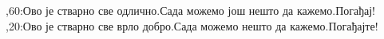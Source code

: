 \documentclass{article}
\begin{document}
\thispagestyle{empty}
\begin{chart}
\grid
{},60:{Ово је стварно све одлично.}{Сада можемо још нешто да кажемо.}{Погађај!}
,20:{Ово је стварно све врло добро.}{Сада можемо нешто да кажемо.}{Погађајте!}
\end{chart}
\end{document}
